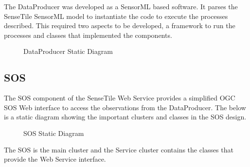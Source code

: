 \documentclass[]{final_report}
\begin{document}
The DataProducer was developed as a SensorML based software. It parses the SenseTile SensorML model to instantiate the code to execute the processes described. This required two aspects to be developed, a framework to run the processes and classes that implemented the components.

\begin{figure}[h]
\centering
{}
\caption{DataProducer Static Diagram}\label{fig:bon_static_diagam_producer.png}
\end{figure}


\newpage
\subsection {SOS}

The SOS component of the SenseTile Web Service provides a simplified OGC SOS Web interface to access the observations from the DataProducer. The below is a static diagram showing the important clusters and classes in the SOS design.

 \begin{figure}[h!]
\centering
{}
\caption{SOS Static Diagram}\label{fig:bon_static_diagam_provider.png}
\end{figure}
The SOS is the main cluster and the Service cluster contains the classes that provide the Web Service interface.
\end{document}
